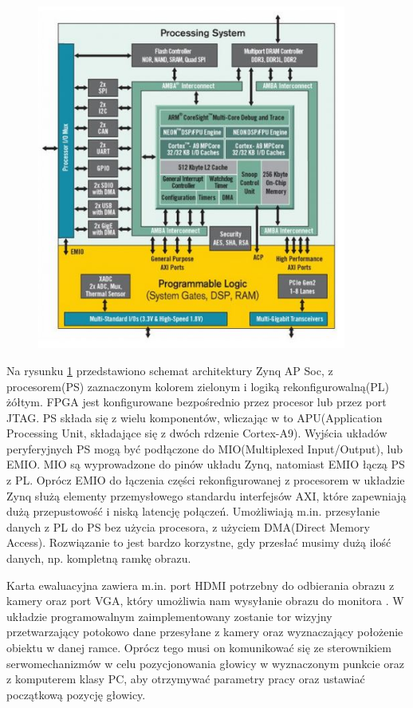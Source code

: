 \begin{figure}[h]
	\centering
	\includegraphics[width=4in]{zybo_scheme.jpg}
	\label{fig:zybo_scheme}
\end{figure}

Na rysunku \ref{fig:zybo_scheme} przedstawiono schemat architektury Zynq AP Soc, z procesorem(PS) zaznaczonym kolorem zielonym i logiką rekonfigurowalną(PL) żółtym. FPGA jest konfigurowane bezpośrednio przez procesor lub przez port JTAG. PS składa się z wielu komponentów, wliczając w to APU(Application Processing Unit, składające się z dwóch rdzenie Cortex-A9). Wyjścia układów peryferyjnych PS mogą być podłączone do MIO(Multiplexed Input/Output), lub EMIO. MIO są wyprowadzone do pinów układu Zynq, natomiast EMIO łączą PS z PL. Oprócz EMIO do łączenia części rekonfigurowanej z procesorem w układzie Zynq służą elementy przemysłowego standardu interfejsów AXI, które zapewniają dużą przepustowość i niską latencję połączeń\cite{Zynq}. Umożliwiają m.in. przesyłanie danych z PL do PS bez użycia procesora, z użyciem DMA(Direct Memory Access). Rozwiązanie to jest bardzo korzystne, gdy przesłać musimy dużą ilość danych, np. kompletną ramkę obrazu.

Karta ewaluacyjna zawiera m.in. port HDMI potrzebny do odbierania obrazu z kamery oraz port VGA, który umożliwia nam wysyłanie obrazu do monitora \cite{Xi}.
W układzie programowalnym zaimplementowany zostanie tor wizyjny przetwarzający potokowo dane przesyłane z kamery oraz wyznaczający położenie obiektu w danej ramce.
Oprócz tego musi on komunikować się ze sterownikiem serwomechanizmów w celu pozycjonowania głowicy w wyznaczonym punkcie oraz z komputerem klasy PC, aby otrzymywać parametry pracy oraz ustawiać początkową pozycję głowicy.

